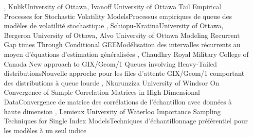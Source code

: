 
{
,  {Kulik}{University of Ottawa},  {Ivanoff}
{University of Ottawa}
}
{Tail Empirical Processes for Stochastic Volatility Models}{Processus empiriques de queue des modèles de volatilité stochastique}
{\bubbleE \enspace \screenE}
{
,  {Schiopu-Kratina}{University of Ottawa},  {Bergeron} {University of Ottawa},  {Alvo}
{University of Ottawa}
}
{Modeling Recurrent Gap times Through Conditional GEE}{Modélisation des intervalles récurrents au moyen d’équations d'estimation généralisées}
{\bubbleE \enspace \screenE}
{
,  {Chaudhry}
{Royal Military College of Canada}
}
{New approach to GIX/Geom/1 Queues involving Heavy-Tailed distributions}{Nouvelle approche pour les files d’attente GIX/Geom/1 comportant des distributions à queue lourde}
{\bubbleE \enspace \screenE}
{
,  {Nkurunziza}
{University of Windsor}
}
{On Convergence of Sample Correlation Matrices in High-Dimensional Data}{Convergence de matrice des corrélations de l’échantillon avec données à haute dimension}
{\bubbleE \enspace \screenE}
{
,  {Lemieux}
{University of Waterloo}
}
{Importance Sampling Techniques for Single Index Models}{Techniques d’échantillonnage préférentiel pour les modèles à un seul indice}
{\bubbleE \enspace \screenE}


